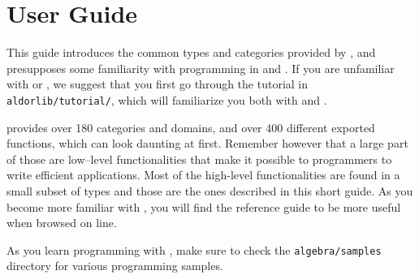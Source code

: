 \section{User Guide}

This guide introduces the common types and categories provided by \libalgebra,
and presupposes some familiarity with programming in \aldor and \libaldor.
If you are unfamiliar with \aldor or \libaldor, we suggest that you first go
through the tutorial in {\tt aldorlib/tutorial/}, which
will familiarize you both with \aldor and \libaldor.

\libalgebra{} provides over 180 categories and domains, and over 400 different
exported functions, which can look daunting at first. Remember however
that a large part of those are low--level functionalities that make it
possible to programmers to write efficient applications. Most of the
high-level functionalities are found in a small subset of types and
those are the ones described in this short guide. As you become more
familiar with \libalgebra, you will find the reference guide to be more
useful when browsed on line.

As you learn programming with \libalgebra, make sure to check the
{\tt algebra/samples} directory for various programming samples.

